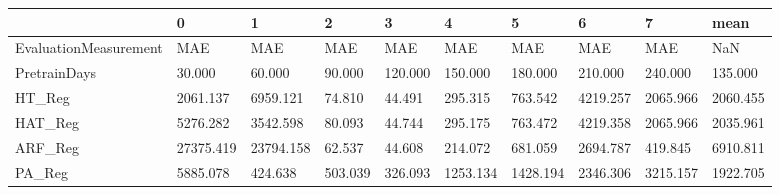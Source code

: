 \begin{tabular}{llllllllll}
\toprule
{} &         0 &         1 &       2 &       3 &        4 &        5 &        6 &        7 &     mean \\
\midrule
EvaluationMeasurement &       MAE &       MAE &     MAE &     MAE &      MAE &      MAE &      MAE &      MAE &      NaN \\
PretrainDays          &    30.000 &    60.000 &  90.000 & 120.000 &  150.000 &  180.000 &  210.000 &  240.000 &  135.000 \\
HT\_Reg                &  2061.137 &  6959.121 &  74.810 &  44.491 &  295.315 &  763.542 & 4219.257 & 2065.966 & 2060.455 \\
HAT\_Reg               &  5276.282 &  3542.598 &  80.093 &  44.744 &  295.175 &  763.472 & 4219.358 & 2065.966 & 2035.961 \\
ARF\_Reg               & 27375.419 & 23794.158 &  62.537 &  44.608 &  214.072 &  681.059 & 2694.787 &  419.845 & 6910.811 \\
PA\_Reg                &  5885.078 &   424.638 & 503.039 & 326.093 & 1253.134 & 1428.194 & 2346.306 & 3215.157 & 1922.705 \\
\bottomrule
\end{tabular}
